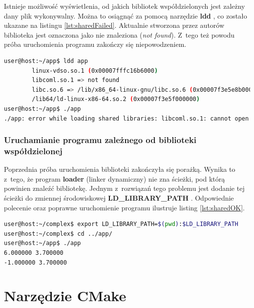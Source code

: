 Istnieje możliwość wyświetlenia, od jakich bibliotek współdzielonych jest zależny dany plik wykonywalny. Można to osiągnąć za pomocą narzędzie \textbf{ldd} \cite{shared2}, co zostało ukazane na listingu \ref{lst:sharedFailed}. Aktualnie stworzona przez autorów biblioteka jest oznaczona jako nie znaleziona (\textit{not found}). Z~tego też powodu próba uruchomienia programu zakończy się niepowodzeniem. 

\newpage

\begin{lstlisting}[language=bash, language=Cmd, caption={Użycie polecenia \textit{ldd} i~pierwsza, nieudana próba uruchomienia aplikacji zależnej od biblioteki współdzielonej}, label={lst:sharedFailed}]
user@host:~/app$ ldd app
        linux-vdso.so.1 (0x00007fffc16b6000)
        libcoml.so.1 => not found
        libc.so.6 => /lib/x86_64-linux-gnu/libc.so.6 (0x00007f3e5e8b0000)
        /lib64/ld-linux-x86-64.so.2 (0x00007f3e5f000000)
user@host:~/app$ ./app
./app: error while loading shared libraries: libcoml.so.1: cannot open shared object file: No such file or directory
\end{lstlisting}

\subsubsection*{Uruchamianie programu zależnego od biblioteki współdzielonej}
Poprzednia próba uruchomienia biblioteki zakończyła się porażką. Wynika to z~tego, że program \textbf{loader} (linker dynamiczny) nie zna ścieżki, pod którą powinien znaleźć bibliotekę. Jednym z~rozwiązań tego problemu jest dodanie tej ścieżki do zmiennej środowiskowej \textbf{LD\_LIBRARY\_PATH} \cite{shared3}. Odpowiednie polecenie oraz poprawne uruchomienie programu ilustruje listing \ref{lst:sharedOK}.

\begin{lstlisting}[language=bash, language=Cmd, caption={Dodanie ścieżki zawierającej bibliotekę do zmiennej \textit{LD\_LIBRARY\_PATH} i~poprawne uruchomienie przykładowej aplikacji}, label={lst:sharedOK}]
user@host:~/complex$ export LD_LIBRARY_PATH=$(pwd):$LD_LIBRARY_PATH
user@host:~/complex$ cd ../app/
user@host:~/app$ ./app
6.000000 3.700000
-1.000000 3.700000
\end{lstlisting}


\section{Narzędzie CMake}

